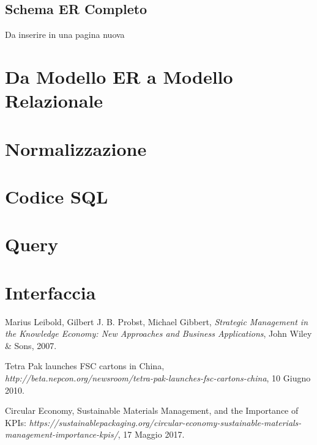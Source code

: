 \documentclass[paper=a4, fontsize=11pt,x11names]{report}
\begin{document}

\clearpage
\section{Schema ER Completo}
Da inserire in una pagina nuova

\chapter{Da Modello ER a Modello Relazionale}

\chapter{Normalizzazione}

\chapter{Codice SQL}

\chapter{Query}

\chapter{Interfaccia}



\begin{thebibliography}{9}


 Marius Leibold, Gilbert J. B. Probst, Michael Gibbert,
  \textit{Strategic Management in the Knowledge Economy: New Approaches and Business Applications},
  John Wiley \& Sons,
 2007.
 
	Tetra Pak launches FSC cartons in China, \textit{http://beta.nepcon.org/newsroom/tetra-pak-launches-fsc-cartons-china},
	10 Giugno 2010.
	
	Circular Economy, Sustainable Materials Management, and the Importance of KPIs: \textit{https://sustainablepackaging.org/circular-economy-sustainable-materials-management-importance-kpis/},
	17 Maggio 2017.

\end{thebibliography}


\end{document}
